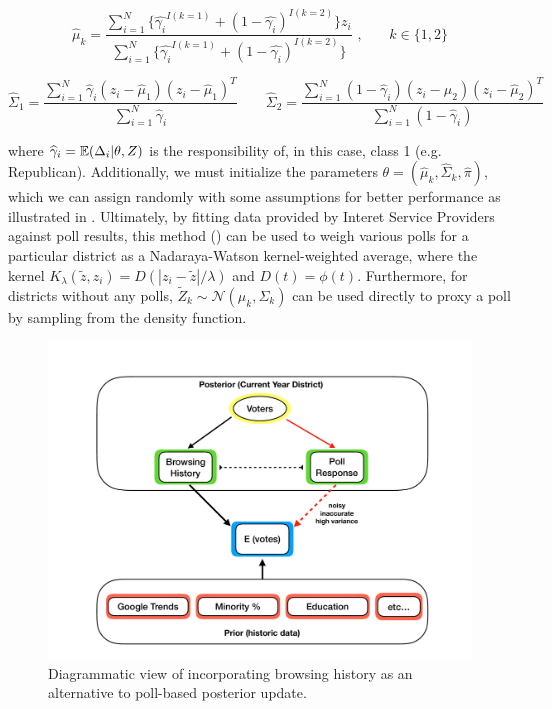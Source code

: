 \documentclass[12pt]{article}
\begin{document}
\begin{equation}
\hat{\mu}_k = \frac{\sum_{i=1}^{N}\{\hat{\gamma_i}^{I(k=1)} + (1-\hat{\gamma_i})^{I(k=2)}\}z_i}{\sum_{i=1}^{N}\{\hat{\gamma_i}^{I(k=1)} + (1-\hat{\gamma_i})^{I(k=2)}\}} \text{\ ,} \qquad k \in \{1,2\}
\label{eq:maximization1}
\end{equation}

\begin{equation}
\hat{\Sigma}_{1} = \frac{\sum_{i=1}^{N}\hat{\gamma}_i(z_i - \hat{\mu}_1)(z_i - \hat{\mu}_1)^T}{\sum_{i=1}^{N}\hat{\gamma}_i} \qquad \hat{\Sigma}_{2} = \frac{\sum_{i=1}^{N}(1-\hat{\gamma}_i)(z_i - \hat{\mu}_2)(z_i - \hat{\mu}_2)^T}{\sum_{i=1}^{N}(1-\hat{\gamma}_i)}
\label{eq:maximization2}
\end{equation}

where $\widehat{\gamma}_i = \mathbb{E}(\Delta_i|\theta, Z)$ is the responsibility of, in this case, class 1 (e.g. Republican). Additionally, we must initialize the parameters $\theta = (\hat{\mu}_k, \hat{\Sigma}_k, \hat{\pi})$, which we can assign randomly with some  assumptions for better performance as illustrated in \cite{comarela2018browse}. Ultimately, by fitting data provided by Interet Service Providers against poll results, this method () can be used to weigh various polls for a particular district as a Nadaraya-Watson kernel-weighted average, where the kernel $K_{\lambda}(\tilde{z}, z_i) = D(|z_i-\tilde{z}|/\lambda)$ and $D(t) = \phi(t)$. Furthermore, for districts without any polls, $\tilde{Z}_k \sim \mathcal{N}(\mu_k, \Sigma_k)$ can be used directly to proxy a poll by sampling from the density function.  

\begin{figure}[tb]
  \centering
  \includegraphics[scale=0.3]{browsing_diagram.pdf}
  \caption{Diagrammatic view of incorporating browsing history as an alternative to poll-based posterior update.}
  \label{fig:browsing}
\end{figure}
\end{document}
